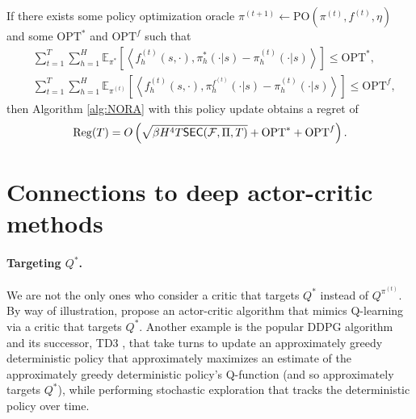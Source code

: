 \begin{cor}
    If there exists some policy optimization oracle $\pi^{(t+1)} \gets \mathrm{PO}(\pi^{(t)}, f^{(t)}, \eta)$ and some $\mathrm{OPT}^*$ and $\mathrm{OPT}^f$ such that
    \begin{subequations}
    \begin{align}
        &\sum_{t=1}^T \sum_{h=1}^H \mathbb{E}_{\pi^*}\left[\left\langle f_h^{(t)}(s, \cdot), \pi_h^*(\cdot | s)-\pi_h^{(t)}(\cdot | s)\right\rangle\right] \leq \mathrm{OPT}^*,\\
    &\sum_{t=1}^T \sum_{h=1}^H \mathbb{E}_{\pi^{(t)}}\left[\left\langle f_h^{(t)}(s, \cdot), \pi_h^{f^{(t)}}(\cdot | s)-\pi_h^{(t)}(\cdot | s)\right\rangle\right] \leq \mathrm{OPT}^f,
    \end{align}
    \end{subequations}
    then Algorithm \ref{alg:NORA} with this policy update obtains a regret of
    \begin{equation}\mathrm{Reg}(T) = O\left(\sqrt{\beta H^4 T \mathsf{SEC}({\mathcal{F}}, \Pi, T)} + \mathrm{OPT}^* + \mathrm{OPT}^f\right).\end{equation}
\end{cor}


\section{Connections to deep actor-critic methods}


\paragraph{Targeting $Q^*$.} We are not the only ones who consider a critic that targets $Q^*$ instead of $Q^{\pi^{(t)}}$. By way of illustration, \citet{crites1994actorcriticqlearning} propose an actor-critic algorithm that mimics Q-learning via a critic that targets $Q^*$. Another example is the popular DDPG algorithm \citep{lillicrap2015continuous} and its successor, TD3 \citep{fujimoto2018addressing}, that take turns to update an approximately greedy deterministic policy that approximately maximizes an estimate of the approximately greedy deterministic policy's Q-function (and so approximately targets $Q^*$), while performing stochastic exploration that tracks the deterministic policy over time. 

